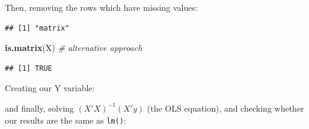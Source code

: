\documentclass[]{article}
\newenvironment{Shaded}{\begin{snugshade}}{\end{snugshade}}
\newcommand{\KeywordTok}[1]{\textcolor[rgb]{0.13,0.29,0.53}{\textbf{#1}}}
\newcommand{\DecValTok}[1]{\textcolor[rgb]{0.00,0.00,0.81}{#1}}
\newcommand{\StringTok}[1]{\textcolor[rgb]{0.31,0.60,0.02}{#1}}
\newcommand{\CommentTok}[1]{\textcolor[rgb]{0.56,0.35,0.01}{\textit{#1}}}
\newcommand{\OperatorTok}[1]{\textcolor[rgb]{0.81,0.36,0.00}{\textbf{#1}}}
\newcommand{\NormalTok}[1]{#1}
\begin{document}
Then, removing the rows which have missing values:

\begin{Shaded}
\end{Shaded}

\begin{verbatim}
## [1] "matrix"
\end{verbatim}

\begin{Shaded}
\begin{Highlighting}[]
\KeywordTok{is.matrix}\NormalTok{(X) }\CommentTok{# alternative approach}
\end{Highlighting}
\end{Shaded}

\begin{verbatim}
## [1] TRUE
\end{verbatim}

Creating our Y variable:

\begin{Shaded}
\end{Shaded}

and finally, solving \((X'X)^{-1}(X'y)\) (the OLS equation), and
checking whether our results are the same as \texttt{lm()}:

\begin{Shaded}
\end{Shaded}
\end{document}
